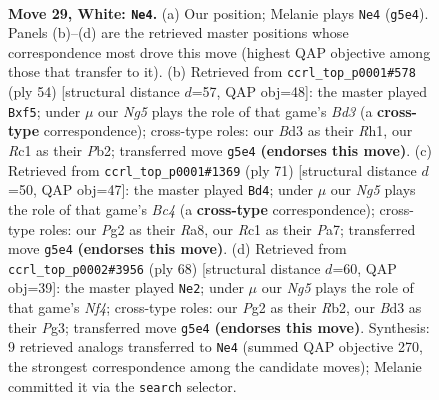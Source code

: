 \documentclass[11pt]{article}
\begin{document}
\clearpage

\begin{figure}[p]\centering
\begin{subfigure}{0.46\textwidth}\centering
\resizebox{\linewidth}{!}{%
\newchessgame
\chessboard[
  setfen={1nb4r/6k1/1p2p1p1/4r1N1/5pp1/3B1P2/2P3P1/2RN1K2 w - - 0 29},
  showmover=false,
  pgfstyle=straightmove, color=movearrow, markmove={g5-e4}
]}
\caption{}
\end{subfigure}\hfill
\begin{subfigure}{0.46\textwidth}\centering
\resizebox{\linewidth}{!}{%
\newchessgame
\chessboard[
  setfen={r5k1/3r2b1/pn2N2p/1p3p1P/5P2/1N1B4/PPP5/1K5R w - - 0 28},
  showmover=false,
  pgfstyle=straightmove, color=movearrow, markmove={d3-f5}
]}
\caption{}
\end{subfigure}
\\[4pt]
\begin{subfigure}{0.46\textwidth}\centering
\resizebox{\linewidth}{!}{%
\newchessgame
\chessboard[
  setfen={r7/p4R1R/b1k1p3/1pb1PnP1/2p1N3/8/PP3P2/2K5 b - - 16 36},
  showmover=false,
  pgfstyle=straightmove, color=movearrow, markmove={c5-d4}
]}
\caption{}
\end{subfigure}\hfill
\begin{subfigure}{0.46\textwidth}\centering
\resizebox{\linewidth}{!}{%
\newchessgame
\chessboard[
  setfen={6bk/7p/r2b2p1/1p6/1P1pBN2/3P1KPP/1R6/8 w - - 2 35},
  showmover=false,
  pgfstyle=straightmove, color=movearrow, markmove={f4-e2}
]}
\caption{}
\end{subfigure}
\caption{\textbf{Move 29, White: \texttt{Ne4}.} (a) Our position; Melanie plays \texttt{Ne4} (\texttt{g5e4}). Panels (b)--(d) are the retrieved master positions whose correspondence most drove this move (highest QAP objective among those that transfer to it). (b) Retrieved from \texttt{ccrl\_top\_p0001\#578} (ply 54) [structural distance $d$=57, QAP obj=48]: the master played \texttt{Bxf5}; under $\mu$ our \emph{Ng5} plays the role of that game's \emph{Bd3} (a \textbf{cross-type} correspondence); cross-type roles: our \emph{B}d3 as their \emph{R}h1, our \emph{R}c1 as their \emph{P}b2; transferred move \texttt{g5e4} \textbf{(endorses this move)}. (c) Retrieved from \texttt{ccrl\_top\_p0001\#1369} (ply 71) [structural distance $d$=50, QAP obj=47]: the master played \texttt{Bd4}; under $\mu$ our \emph{Ng5} plays the role of that game's \emph{Bc4} (a \textbf{cross-type} correspondence); cross-type roles: our \emph{P}g2 as their \emph{R}a8, our \emph{R}c1 as their \emph{P}a7; transferred move \texttt{g5e4} \textbf{(endorses this move)}. (d) Retrieved from \texttt{ccrl\_top\_p0002\#3956} (ply 68) [structural distance $d$=60, QAP obj=39]: the master played \texttt{Ne2}; under $\mu$ our \emph{Ng5} plays the role of that game's \emph{Nf4}; cross-type roles: our \emph{P}g2 as their \emph{R}b2, our \emph{B}d3 as their \emph{P}g3; transferred move \texttt{g5e4} \textbf{(endorses this move)}. Synthesis: 9 retrieved analogs transferred to \texttt{Ne4} (summed QAP objective 270, the strongest correspondence among the candidate moves); Melanie committed it via the \texttt{search} selector.}
\label{fig:thought-m56}
\end{figure}
\end{document}
